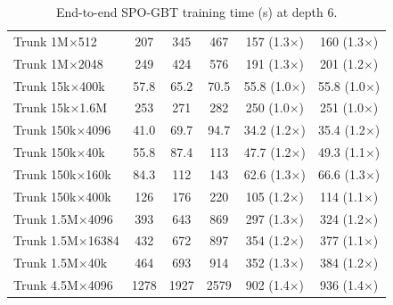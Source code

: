 \begin{table}[p]
\begin{tabular}{l|ccc|cc}
        Trunk 1M$\times$512 & 207 & 345 & 467 & 157 (1.3$\times$) & 160 (1.3$\times$) \\
        Trunk 1M$\times$2048 & 249 & 424 & 576 & 191 (1.3$\times$) & 201 (1.2$\times$) \\
        Trunk 15k$\times$400k & 57.8 & 65.2 & 70.5 & 55.8 (1.0$\times$) & 55.8 (1.0$\times$) \\
        Trunk 15k$\times$1.6M & 253 & 271 & 282 & 250 (1.0$\times$) & 251 (1.0$\times$) \\
        Trunk 150k$\times$4096 & 41.0 & 69.7 & 94.7 & 34.2 (1.2$\times$) & 35.4 (1.2$\times$) \\
        Trunk 150k$\times$40k & 55.8 & 87.4 & 113 & 47.7 (1.2$\times$) & 49.3 (1.1$\times$) \\
        Trunk 150k$\times$160k & 84.3 & 112 & 143 & 62.6 (1.3$\times$) & 66.6 (1.3$\times$) \\
        Trunk 150k$\times$400k & 126 & 176 & 220 & 105 (1.2$\times$) & 114 (1.1$\times$) \\
        Trunk 1.5M$\times$4096 & 393 & 643 & 869 & 297 (1.3$\times$) & 324 (1.2$\times$) \\
        Trunk 1.5M$\times$16384 & 432 & 672 & 897 & 354 (1.2$\times$) & 377 (1.1$\times$) \\
        Trunk 1.5M$\times$40k & 464 & 693 & 914 & 352 (1.3$\times$) & 384 (1.2$\times$) \\
        Trunk 4.5M$\times$4096 & 1278 & 1927 & 2579 & 902 (1.4$\times$) & 936 (1.4$\times$) \\
        \hline
    \end{tabular}
    \caption{End-to-end SPO-GBT training time (s) at depth 6.}
    \label{tab:overall-gbt}
\end{table}
